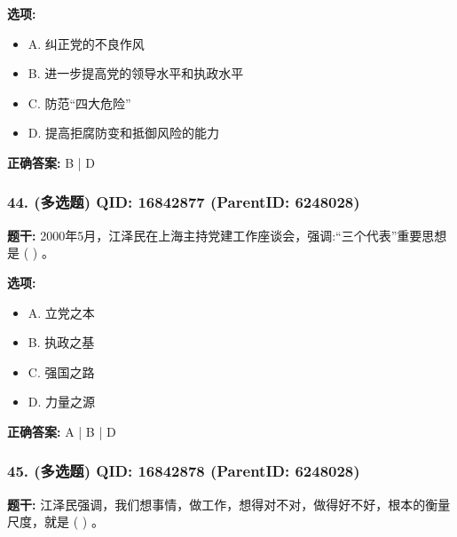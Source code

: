 \documentclass[12pt,UTF8]{ctexart}
\begin{document}
\textbf{选项:}
\begin{itemize}[leftmargin=*]

  \item A. 纠正党的不良作风

  \item B. 进一步提高党的领导水平和执政水平

  \item C. 防范“四大危险”

  \item D. 提高拒腐防变和抵御风险的能力

\end{itemize}

\textbf{正确答案:}
B | D

\vspace{0.3em}\hrulefill\vspace{0.7em}

\subsubsection*{44. (多选题) \small QID: 16842877 (ParentID: 6248028)}

\textbf{题干:}
2000年5月，江泽民在上海主持党建工作座谈会，强调:“三个代表”重要思想是 ( ) 。



\textbf{选项:}
\begin{itemize}[leftmargin=*]

  \item A. 立党之本

  \item B. 执政之基

  \item C. 强国之路

  \item D. 力量之源

\end{itemize}

\textbf{正确答案:}
A | B | D

\vspace{0.3em}\hrulefill\vspace{0.7em}

\subsubsection*{45. (多选题) \small QID: 16842878 (ParentID: 6248028)}

\textbf{题干:}
江泽民强调，我们想事情，做工作，想得对不对，做得好不好，根本的衡量尺度，就是 ( ) 。
\end{document}
